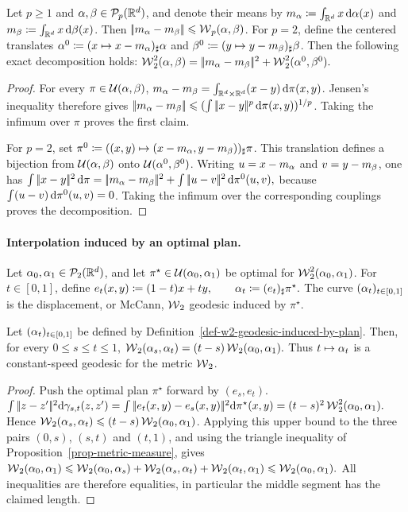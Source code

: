 \begin{prop}\label{prop-wasserstein-mean-decomposition}
Let $p\geq1$ and $\alpha,\beta\in\mathcal{P}_p(\mathbb{R}^d)$, and denote their means by
$m_\alpha\coloneqq\int_{\mathbb{R}^d}x\,\mathrm{d}\alpha(x)$ and
$m_\beta\coloneqq\int_{\mathbb{R}^d}x\,\mathrm{d}\beta(x)$. Then
$|\!| m_\alpha-m_\beta |\!|\leqslant\operatorname{\mathcal{W}}_p(\alpha,\beta)$. For $p=2$, define the centered
translates $\alpha^0\coloneqq(x\mapsto x-m_\alpha)_\sharp\alpha$ and
$\beta^0\coloneqq(y\mapsto y-m_\beta)_\sharp\beta$.
Then the following exact decomposition holds: \(\operatorname{\mathcal{W}}_2^2(\alpha,\beta) = |\!| m_\alpha-m_\beta |\!|^2+\operatorname{\mathcal{W}}_2^2(\alpha^0,\beta^0).\)
\end{prop}
\begin{proof}
For every $\pi\in\mathcal{U}(\alpha,\beta)$,
$m_\alpha-m_\beta=\int_{\mathbb{R}^d\times\mathbb{R}^d}(x-y)\,\mathrm{d}\pi(x,y)$.
Jensen's inequality therefore gives
$|\!| m_\alpha-m_\beta |\!|\leqslant
(\int|\!| x-y |\!|^p\,\mathrm{d}\pi(x,y))^{1/p}$.
Taking the infimum over $\pi$ proves the first claim.

For $p=2$, set
$\pi^0\coloneqq((x,y)\mapsto(x-m_\alpha,y-m_\beta))_\sharp\pi$.
This translation defines a bijection from
$\mathcal{U}(\alpha,\beta)$ onto $\mathcal{U}(\alpha^0,\beta^0)$. Writing
$u=x-m_\alpha$ and $v=y-m_\beta$, one has \(\int|\!| x-y |\!|^2\,\mathrm{d}\pi = |\!| m_\alpha-m_\beta |\!|^2+\int|\!| u-v |\!|^2\,\mathrm{d}\pi^0(u,v),\)
because $\int(u-v)\,\mathrm{d}\pi^0(u,v)=0$. Taking the infimum over the corresponding couplings proves the decomposition.
\end{proof}
\paragraph{Interpolation induced by an optimal plan.}
\label{sec-kantorovich-plan-interpolation}
\begin{defn}\label{def-w2-geodesic-induced-by-plan}
Let $\alpha_0,\alpha_1\in\mathcal{P}_2(\mathbb{R}^d)$, and let $\pi^\star\in\mathcal{U}(\alpha_0,\alpha_1)$ be optimal for $\operatorname{\mathcal{W}}_2^2(\alpha_0,\alpha_1)$. For $t\in[0,1]$, define
\(e_t(x,y)\coloneqq(1-t)x+t y, \qquad \alpha_t\coloneqq(e_t)_\sharp\pi^\star.\)
The curve $(\alpha_t)_{t\in[0,1]}$ is the displacement, or McCann, $\operatorname{\mathcal{W}}_2$ geodesic induced by $\pi^\star$.
\end{defn}
\begin{prop}\label{prop-plan-interpolation-w2-geodesic}
Let $(\alpha_t)_{t\in[0,1]}$ be defined by Definition~\ref{def-w2-geodesic-induced-by-plan}. Then, for every $0\leq s\leq t\leq1$, \(\operatorname{\mathcal{W}}_2(\alpha_s,\alpha_t) = (t-s)\operatorname{\mathcal{W}}_2(\alpha_0,\alpha_1).\)
Thus $t\mapsto\alpha_t$ is a constant-speed geodesic for the metric $\operatorname{\mathcal{W}}_2$.
\end{prop}
\begin{proof}
Push the optimal plan $\pi^\star$ forward by $(e_s,e_t)$.
\(\int |\!| z-z' |\!|^2\mathrm{d}\gamma_{s,t}(z,z') = \int |\!| e_t(x,y)-e_s(x,y) |\!|^2\mathrm{d}\pi^\star(x,y) = (t-s)^2\operatorname{\mathcal{W}}_2^2(\alpha_0,\alpha_1).\)
Hence $\operatorname{\mathcal{W}}_2(\alpha_s,\alpha_t)\leqslant(t-s)\operatorname{\mathcal{W}}_2(\alpha_0,\alpha_1)$. Applying this upper bound to the three pairs $(0,s)$, $(s,t)$ and $(t,1)$, and using the triangle inequality of Proposition~\ref{prop-metric-measure}, gives
\(\operatorname{\mathcal{W}}_2(\alpha_0,\alpha_1) \leqslant \operatorname{\mathcal{W}}_2(\alpha_0,\alpha_s)+\operatorname{\mathcal{W}}_2(\alpha_s,\alpha_t)+\operatorname{\mathcal{W}}_2(\alpha_t,\alpha_1) \leqslant \operatorname{\mathcal{W}}_2(\alpha_0,\alpha_1).\)
All inequalities are therefore equalities, in particular the middle segment has the claimed length.
\end{proof}
